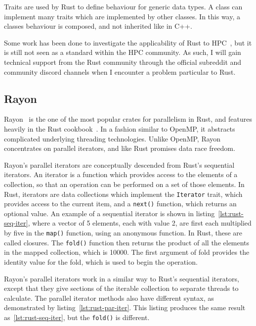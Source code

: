Traits are used by Rust to define behaviour for generic data types. A class can implement many traits which are implemented by other classes. In this way, a classes behaviour is composed, and not inherited like in C++.

Some work has been done to investigate the applicability of Rust to HPC~\cite{bioinformatics, blanco2016}, but it is still not seen as a standard within the HPC community. As such, I will gain technical support from the Rust community through the official subreddit and community discord channels when I encounter a problem particular to Rust.

\subsection{Rayon}\label{sec:back-rayon}
Rayon~\cite{RustRayon} is the one of the most popular crates for parallelism in Rust, and features heavily in the Rust cookbook~\cite{RustCookPara}. In a fashion similar to OpenMP, it abstracts complicated underlying threading technologies. Unlike OpenMP, Rayon concentrates on parallel iterators, and like Rust promises data race freedom.

Rayon's parallel iterators are conceptually descended from Rust's sequential iterators. An iterator is a function which provides access to the elements of a collection, so that an operation can be performed on a set of those elements. In Rust, iterators are data collections which implement the \texttt{Iterator} trait, which provides access to the current item, and a \texttt{next()} function, which returns an optional value.
An example of a sequential iterator is shown in listing~\ref{lst:rust-seq-iter}, where a vector of 5 elements, each with value 2, are first each multiplied by five in the \texttt{map()} function, using an anonymous function. In Rust, these are called closures. The \texttt{fold()} function then returns the product of all the elements in the mapped collection, which is 10000. The first argument of fold provides the identity value for the fold, which is used to begin the operation.

Rayon's parallel iterators work in a similar way to Rust's sequential iterators, except that they give sections of the iterable collection to separate threads to calculate. The parallel iterator methods also have different syntax, as demonstrated by listing~\ref{lst:rust-par-iter}. This listing produces the same result as~\ref{lst:rust-seq-iter}, but the \texttt{fold()} is different.

